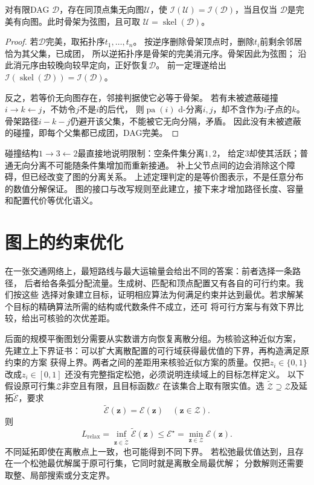 \begin{theorem}[有向图的完美无向图表示]
  \label{thm:graph-theory-perfect-undirected}
  对有限DAG \(\mathcal D\)，存在同顶点集无向图\(\mathcal U\)，使
  \(\mathcal I(\mathcal U)=\mathcal I(\mathcal D)\)，当且仅当
  \(\mathcal D\)是完美有向图。此时骨架为弦图，且可取
  \(\mathcal U=\operatorname{skel}(\mathcal D)\)。
\end{theorem}

\begin{proof}
若\(\mathcal D\)完美，取拓扑序\(t_1,\ldots,t_n\)。
按逆序删除骨架顶点时，删除\(t_i\)前剩余邻居恰为其父集，已成团，
所以逆拓扑序是骨架的完美消元序。骨架因此为弦图；
沿此消元序由较晚向较早定向，正好恢复\(\mathcal D\)。
前一定理遂给出
\(\mathcal I(\operatorname{skel}(\mathcal D))=\mathcal I(\mathcal D)\)。

反之，若等价无向图存在，邻接判据使它必等于骨架。
若有未被遮蔽碰撞\(i\to k\leftarrow j\)，不妨令\(j\)不是\(i\)的后代，
则\(\operatorname{pa}(i)\) d-分离\(i,j\)，却不含作为\(i\)子点的\(k\)。
骨架路径\(i-k-j\)仍避开该父集，不能被它无向分隔，矛盾。
因此没有未被遮蔽的碰撞，即每个父集都已成团，DAG完美。
\end{proof}

碰撞结构\(1\to3\leftarrow2\)最直接地说明限制：空条件集分离\(1,2\)，
给定\(3\)却使其活跃；普通无向分离不可能随条件集增加而重新接通。
补上父节点间的边会消除这个障碍，但已经改变了图的分离关系。
上述定理判定的是等价图表示，不是任意分布的数值分解保证。
图的接口与改写规则至此建立，接下来才增加路径长度、容量和配置代价等优化语义。

\section{图上的约束优化}
\label{sec:graph-theory-exact-approximate-algorithms}

在一张交通网络上，最短路线与最大运输量会给出不同的答案：前者选择一条路径，
后者给各条弧分配流量。生成树、匹配和顶点配置又有各自的可行约束。我们按这些
选择对象建立目标，证明相应算法为何满足约束并达到最优。若求解某个目标的精确算法所需的结构或代数条件不成立，还可
将可行方案与有效下界比较，给出可核验的次优差距。

后面的规模平衡图划分需要从实数谱方向恢复离散分组。为核验这种近似方案，
先建立上下界证书：可以扩大离散配置的可行域获得最优值的下界，再构造满足原约束的方案
获得上界。两者之间的差距用来核验近似方案的质量。仅把\(z_i\in\{0,1\}\)改成\(z_i\in[0,1]\)
还没有完整指定松弛，必须说明连续域上的目标怎样定义。
以下假设原可行集\(\mathcal Z\)非空且有限，且目标函数\(\mathcal E\)
在该集合上取有限实值。选
\(\widetilde{\mathcal Z}\supseteq\mathcal Z\)及延拓\(\widetilde{\mathcal E}\)，要求
\[
  \widetilde{\mathcal E}(\bm z)=\mathcal E(\bm z)\quad(\bm z\in\mathcal Z).
\]
则
\[
  L_{\mathrm{relax}}
  =\inf_{\bm z\in\widetilde{\mathcal Z}}\widetilde{\mathcal E}(\bm z)
  \leq \mathcal E^\star
  =\min_{\bm z\in\mathcal Z}\mathcal E(\bm z).
\]
不同延拓即使在离散点上一致，也可能得到不同下界。
若松弛最优值达到，且存在一个松弛最优解属于原可行集，它同时就是离散全局最优解；
分数解则还需要取整、局部搜索或分支定界。

